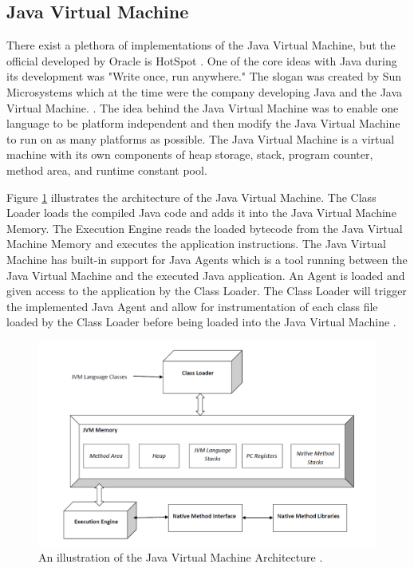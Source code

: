\subsection{Java Virtual Machine}
There exist a plethora of implementations of the Java Virtual Machine, but the official developed by Oracle is HotSpot \parencite{hotSpot}. One of the core ideas with Java during its development was "Write once, run anywhere." The slogan was created by Sun Microsystems which at the time were the company developing Java and the Java Virtual Machine. \parencite{Craig_2006}. The idea behind the Java Virtual Machine was to enable one language to be platform independent and then modify the Java Virtual Machine to run on as many platforms as possible. The Java Virtual Machine is a virtual machine with its own components of heap storage, stack, program counter, method area, and runtime constant pool.

Figure \ref{fig:JVM} illustrates the architecture of the Java Virtual Machine. The Class Loader loads the compiled Java code and adds it into the Java Virtual Machine Memory. The Execution Engine reads the loaded bytecode from the Java Virtual Machine Memory and executes the application instructions. The Java Virtual Machine has built-in support for Java Agents which is a tool running between the Java Virtual Machine and the executed Java application. An Agent is loaded and given access to the application by the Class Loader. The Class Loader will trigger the implemented Java Agent and allow for instrumentation of each class file loaded by the Class Loader before being loaded into the Java Virtual Machine \parencite{venners_1999, instru}.

\begin{figure}[H]
  \centering
  \includegraphics[width=\textwidth]{images/JvmSpec7.png}
  \caption{An illustration of the Java Virtual Machine Architecture \parencite{jvm}. }
  \label{fig:JVM}
\end{figure}


